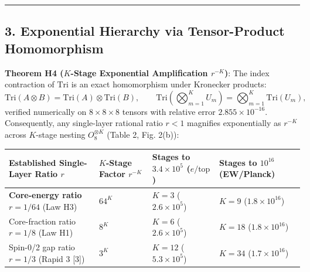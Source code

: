 \documentclass[
  a4paper,
]{article}
\newcounter{none} %
\begin{document}
\begin{center}\rule{0.5\linewidth}{0.5pt}\end{center}

\subsection{3. Exponential Hierarchy via Tensor-Product
Homomorphism}\label{exponential-hierarchy-via-tensor-product-homomorphism}

\textbf{Theorem H4 (\(K\)-Stage Exponential Amplification \(r^{-K}\))}:
The index contraction of \(\mathrm{Tri}\) is an exact homomorphism under
Kronecker products:
\[\mathrm{Tri}(A \otimes B) = \mathrm{Tri}(A) \otimes \mathrm{Tri}(B), \qquad \mathrm{Tri}\!\left(\bigotimes_{m=1}^{K} U_m\right) = \bigotimes_{m=1}^{K} \mathrm{Tri}(U_m),\]
verified numerically on \(8\times 8\times 8\) tensors with relative
error \textbf{\(2.855 \times 10^{-16}\)}. Consequently, any single-layer
rational ratio \(r < 1\) magnifies exponentially as \(r^{-K}\) across
\(K\)-stage nesting \(O_8^{\otimes K}\) (Table 2, Fig. 2(b)):

{\def\LTcaptype{none} %
\begin{longtable}[]{@{}
  >{\raggedright\arraybackslash}p{}
  >{\centering\arraybackslash}p{}
  >{\centering\arraybackslash}p{}
  >{\centering\arraybackslash}p{}@{}}
\toprule\noalign{}
\begin{minipage}[b]{\linewidth}\raggedright
Established Single-Layer Ratio \(r\)
\end{minipage} & \begin{minipage}[b]{\linewidth}\centering
\(K\)-Stage Factor \(r^{-K}\)
\end{minipage} & \begin{minipage}[b]{\linewidth}\centering
Stages to \(3.4 \times 10^5\) (\(e/\text{top}\))
\end{minipage} & \begin{minipage}[b]{\linewidth}\centering
Stages to \(10^{16}\) (EW/Planck)
\end{minipage} \\
\midrule\noalign{}
\endhead
\bottomrule\noalign{}
\endlastfoot
\textbf{Core-energy ratio \(r = 1/64\)} (Law H3) & \(64^K\) &
\textbf{\(K = 3\)} (\(2.6 \times 10^5\)) & \textbf{\(K = 9\)}
(\(1.8 \times 10^{16}\)) \\
Core-fraction ratio \(r = 1/8\) (Law H1) & \(8^K\) & \(K = 6\)
(\(2.6 \times 10^5\)) & \(K = 18\) (\(1.8 \times 10^{16}\)) \\
Spin-0/2 gap ratio \(r = 1/3\) (Rapid 3 {[}3{]}) & \(3^K\) & \(K = 12\)
(\(5.3 \times 10^5\)) & \(K = 34\) (\(1.7 \times 10^{16}\)) \\
\end{longtable}
}
\end{document}

